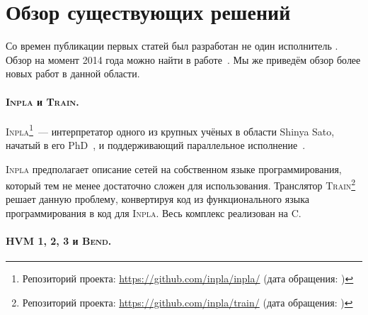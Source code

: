 
\section{Обзор существующих решений}

Со времен публикации первых статей был разработан не один исполнитель \INs{}.
Обзор на момент 2014 года можно найти в работе~\cite{satoDesignImplementationLowlevel2015}.
Мы же приведём обзор более новых работ в данной области.

\paragraph{\texorpdfstring{\textsc{Inpla} и \textsc{Train}}{Inpla и Train}.}

\textsc{Inpla}\footnote{Репозиторий проекта: \url{https://github.com/inpla/inpla/} (дата обращения: )}~--- интерпретатор одного из крупных учёных в области Shinya Sato, начатый в его PhD~\cite{satoDesignImplementationLowlevel2015}, и поддерживающий параллельное исполнение~\cite{mackieParallelEvaluationInteraction2016}.

\textsc{Inpla} предполагает описание сетей на собственном языке программирования, который тем не менее достаточно сложен для использования.
Транслятор \textsc{Train}\footnote{Репозиторий проекта: \url{https://github.com/inpla/train/} (дата обращения: )} решает данную проблему, конвертируя код из функционального языка программирования в код для \textsc{Inpla}.
Весь комплекс реализован на C.

\paragraph{HVM 1, 2, 3 и \textsc{Bend}.}

